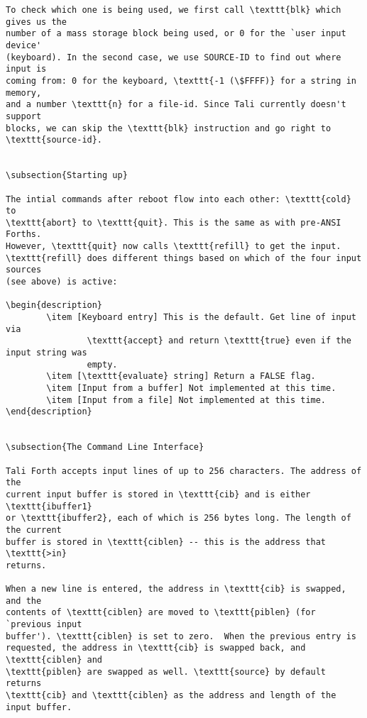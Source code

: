 \begin{lstlisting}[frame=single]
To check which one is being used, we first call \texttt{blk} which gives us the
number of a mass storage block being used, or 0 for the `user input device'
(keyboard). In the second case, we use SOURCE-ID to find out where input is
coming from: 0 for the keyboard, \texttt{-1 (\$FFFF)} for a string in memory,
and a number \texttt{n} for a file-id. Since Tali currently doesn't support
blocks, we can skip the \texttt{blk} instruction and go right to \texttt{source-id}. 


\subsection{Starting up}

The intial commands after reboot flow into each other: \texttt{cold} to
\texttt{abort} to \texttt{quit}. This is the same as with pre-ANSI Forths.
However, \texttt{quit} now calls \texttt{refill} to get the input.
\texttt{refill} does different things based on which of the four input sources
(see above) is active: 

\begin{description} 
        \item [Keyboard entry] This is the default. Get line of input via
                \texttt{accept} and return \texttt{true} even if the input string was
                empty.
        \item [\texttt{evaluate} string] Return a FALSE flag.
        \item [Input from a buffer] Not implemented at this time.
        \item [Input from a file] Not implemented at this time.
\end{description}


\subsection{The Command Line Interface}

Tali Forth accepts input lines of up to 256 characters. The address of the
current input buffer is stored in \texttt{cib} and is either \texttt{ibuffer1}
or \texttt{ibuffer2}, each of which is 256 bytes long. The length of the current
buffer is stored in \texttt{ciblen} -- this is the address that \texttt{>in}
returns. 

When a new line is entered, the address in \texttt{cib} is swapped, and the
contents of \texttt{ciblen} are moved to \texttt{piblen} (for `previous input
buffer'). \texttt{ciblen} is set to zero.  When the previous entry is
requested, the address in \texttt{cib} is swapped back, and \texttt{ciblen} and
\texttt{piblen} are swapped as well. \texttt{source} by default returns
\texttt{cib} and \texttt{ciblen} as the address and length of the input buffer. 


\end{lstlisting}

